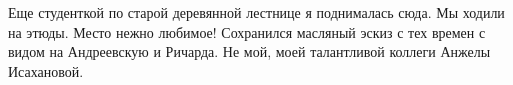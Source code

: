 
 
 
 
 



Еще студенткой по старой деревянной лестнице я поднималась сюда. Мы ходили на
этюды. Место нежно любимое! Сохранился масляный эскиз с тех времен с видом на
Андреевскую и Ричарда. Не мой, моей талантливой коллеги Анжелы Исахановой.
